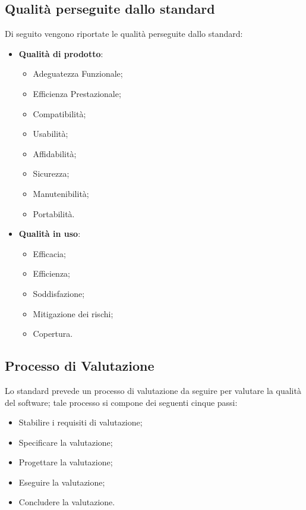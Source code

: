 \subsection{Qualità perseguite dallo standard}
Di seguito vengono riportate le qualità perseguite dallo standard:
\begin{itemize}
	\item \textbf{Qualità di prodotto}:
		\begin{itemize}
			\item Adeguatezza Funzionale;
			\item Efficienza Prestazionale;
			\item Compatibilità;
			\item Usabilità;
			\item Affidabilità;
			\item Sicurezza;
			\item Manutenibilità;
			\item Portabilità.
		\end{itemize}
	\item \textbf{Qualità in uso}:
		\begin{itemize}
			\item Efficacia;
			\item Efficienza;
			\item Soddisfazione;
			\item Mitigazione dei rischi;
			\item Copertura.
		\end{itemize}
\end{itemize}

\subsection{Processo di Valutazione}
Lo standard prevede un processo di valutazione da seguire per valutare la qualità del software; tale processo si compone dei seguenti cinque passi:
\begin{itemize}
	\item Stabilire i requisiti di valutazione;
	\item Specificare la valutazione;
	\item Progettare la valutazione;
	\item Eseguire la valutazione;
	\item Concludere la valutazione.
\end{itemize}
